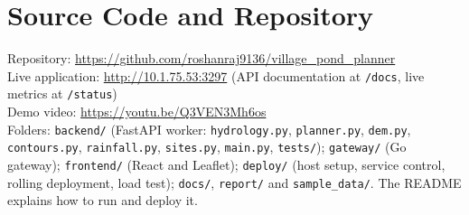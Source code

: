 \documentclass[manuscript,screen,review]{acmart}
\begin{document}



\appendix

\section{Source Code and Repository}
{\raggedright
Repository: \url{https://github.com/roshanraj9136/village_pond_planner}\\
Live application: \url{http://10.1.75.53:3297} (API documentation at \texttt{/docs}, live metrics
at \texttt{/status})\\
Demo video: \url{https://youtu.be/Q3VEN3Mh6os}\\
Folders: \texttt{backend/} (FastAPI worker: \texttt{hydrology.py}, \texttt{planner.py},
\texttt{dem.py}, \texttt{contours.py}, \texttt{rainfall.py}, \texttt{sites.py}, \texttt{main.py},
\texttt{tests/}); \texttt{gateway/} (Go gateway); \texttt{frontend/} (React and Leaflet);
\texttt{deploy/} (host setup, service control, rolling deployment, load test); \texttt{docs/},
\texttt{report/} and \texttt{sample\_data/}. The README explains how to run and deploy it.\par}
\end{document}
